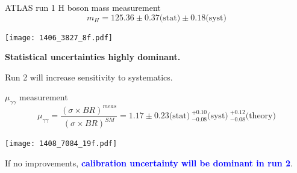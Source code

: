\begin{frame}{ATLAS run 1 H boson mass measurement}
\centering
$$m_H = 125.36 \pm 0.37 \text{(stat)} \pm 0.18 \text{(syst)}$$
\begin{minipage}{0.49\linewidth}
  \texttt{[image: 1406\_3827\_8f.pdf]}
\end{minipage}
\hfill
\begin{minipage}{0.49\linewidth}
\end{minipage}
    {\bf Statistical uncertainties highly dominant.}\\
    \begin{center}   Run 2 will increase sensitivity to systematics.\end{center}
\end{frame}

\begin{frame}{$\mu_{\gamma\gamma}$ measurement}
$$\mu_{\gamma\gamma}=\frac{(\sigma\times BR)^{meas}}{(\sigma\times BR)^{SM}}=1.17 \pm 0.23 \text{(stat)}\ ^{+0.10}_{-0.08}\text{(syst)}\ ^{+0.12}_{-0.08} \text{(theory)}$$
  \begin{minipage}{0.49\linewidth}
    \texttt{[image: 1408\_7084\_19f.pdf]}
  \end{minipage}
  \hfill
  \begin{minipage}{0.49\linewidth}
  \end{minipage}
If no improvements, \textcolor{blue}{\bf calibration uncertainty will be dominant in run 2}.
\end{frame}

